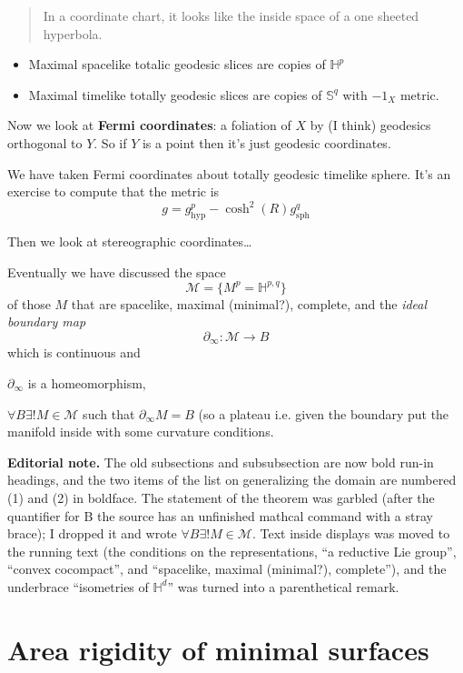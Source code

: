 \begin{quotation}
In a coordinate chart, it looks like the
inside space of a one sheeted hyperbola.
\end{quotation}

\begin{itemize}
\item Maximal spacelike totalic geodesic
slices are copies of $\mathbb{H}^{p}$
\item Maximal timelike totally geodesic
slices are copies of $\mathbb{S}^q$ with
$-1_X$ metric.
\end{itemize}

Now we look at \textbf{Fermi coordinates}: a
foliation of $X$ by (I think) geodesics
orthogonal to $Y$. So if $Y$ is a point then
it's just geodesic coordinates.

We have taken Fermi coordinates about totally
geodesic timelike sphere. It's an exercise to
compute that the metric is
$$g=g^p_{\operatorname{hyp}}-
\cosh^2(R)g_{\operatorname{sph}}^q$$

Then we look at stereographic coordinates…

Eventually we have discussed the space
$$\mathcal{M}= \{ M^p =\mathbb{H}^{p,q} \}$$
of those $M$ that are spacelike, maximal
(minimal?), complete, and the \textit{ideal
boundary map}
$$\partial_\infty: \mathcal{M}\to B$$
which is continuous and
\begin{theorem}
\label{theorem-smith-ideal-boundary}
$\partial_\infty$ is a homeomorphism,

$\forall B \exists ! M \in \mathcal{M}$ such
that $\partial _\infty M= B$ (so a plateau
i.e. given the boundary put the manifold
inside with some curvature conditions.
\end{theorem}

\medskip\noindent
{\bf Editorial note.}
The old subsections and subsubsection are now
bold run-in headings, and the two items of
the list on generalizing the domain are
numbered (1) and (2) in boldface. The
statement of the theorem was garbled (after
the quantifier for B the source has an
unfinished mathcal command with a stray
brace); I dropped it and wrote $\forall B
\exists ! M \in \mathcal{M}$. Text inside
displays was moved to the running text (the
conditions on the representations, ``a
reductive Lie group'', ``convex cocompact'',
and ``spacelike, maximal (minimal?),
complete''), and the underbrace ``isometries
of $\mathbb{H}^{d}$'' was turned into a
parenthetical remark.


\section{Area rigidity of minimal surfaces}
\label{section-neves-area-rigidity}

